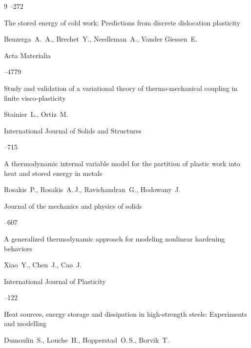 \begin{thebibliography}{9}
--272




\paper The stored energy of cold work: Predictions from discrete dislocation plasticity

\by  Benzerga~A.~A., Brechet~Y., Needleman~A., Vander Giessen~E.

\jour Acta Materialia



--4779




\paper Study and validation of a variational theory of thermo-mechanical coupling in finite visco-plasticity

\by Stainier~L., Ortiz~M.

\jour International Journal of Solids and Structures



--715




\paper A thermodynamic internal variable model for the partition of plastic work into heat and stored energy in metals

\by Rosakis~P., Rosakis~A.\,J., Ravichandran~G., Hodowany~J.

\jour Journal of the mechanics and physics of solids



--607




\paper A generalized thermodynamic approach for modeling nonlinear hardening behaviors

\by Xiao~Y., Chen~J., Cao~J.

\jour International Journal of Plasticity



--122




\paper Heat sources, energy storage and dissipation in high-strength steels: Experiments and modelling

\by Dumoulin~S., Louche~H., Hopperstad~O.\,S., Borvik~T.


\end{thebibliography}

